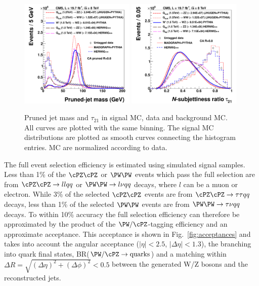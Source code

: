 \begin{figure}[htb]
\begin{center}
\includegraphics[width=0.49\textwidth]{figs/signal-acc-eff/signal-data-qcd-jetmass.pdf}
\includegraphics[width=0.49\textwidth]{figs/signal-acc-eff/signal-data-qcd-Jet-Tau21.pdf}
\end{center}
\caption{Pruned jet mass and $\tau_{21}$ in signal MC, data and background MC.
All curves are plotted with the same binning.
The signal MC distributions are plotted as smooth curves connecting the histogram entries. MC are normalized according to data.
}
\label{fig:taggingvariables}
\end{figure}


The full event selection efficiency is estimated using simulated
signal samples.
Less than 1\% of the $\cPZ\cPZ$ or $\PW\PW$ events which pass the full
selection are from $\cPZ\cPZ \to ll qq$ or $\PW\PW \to l\nu qq$
decays, where $l$ can be a muon or electron.  While 3\% of the
selected $\cPZ\cPZ$ events are from $\cPZ\cPZ \to \tau\tau qq$ decays,
less than 1\% of the selected $\PW\PW$ events are from $\PW\PW \to
\tau\nu qq$ decays.
To within 10\% accuracy the full selection efficiency can
therefore be
approximated by the product of the $\PW/\cPZ$-tagging efficiency
and an approximate acceptance.
This acceptance is shown in Fig.~\ref{fig:acceptances} and
takes into account the angular acceptance
($|\eta| < 2.5$, $|\Delta\eta|<1.3$),
the branching into quark final states,
BR($\PW/\cPZ \to \text{quarks}$) and a matching within
$\Delta R = \sqrt{(\Delta \eta)^2 + (\Delta\phi)^2} <0.5$
between the generated W/Z bosons and the reconstructed jets.


